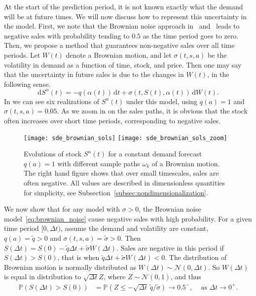 \documentclass[main.tex]{subfiles}
\begin{document}
At the start of the prediction period, it is not known exactly what
the demand will be at future times. We will now discuss how to
represent this uncertainty in the model. First, we note that the Brownian noise
approach in~\cite{raman1995optimal} and~\cite{wu2016dynamic} leads to negative
sales with probability tending to $0.5$ as the time period goes to zero.
Then, we propose a method that guarantees non-negative sales over all
time periods.
Let $W(t)$ denote a Brownian motion, and let $\sigma(t,s,a)$ be the volatility
in demand as a function of time, stock, and price. Then
one may say that the uncertainty in future
sales is due to the changes in $W(t)$, in the following sense.
\begin{equation}\label{eq:brownian_noise}
  \mathrm{d}S^\alpha(t) = -q(\alpha(t))\,\mathrm{d}t + \sigma(t,S(t),\alpha(t))\,\mathrm{d}W(t).
\end{equation}
In  we can see six realizations of
$S^\alpha(t)$ under
this model, using $q(a)=1$ and $\sigma(t,s,a)=0.05$. As we zoom in on
the sales paths, it is obvious that the stock often
increases over short time periods, corresponding to negative sales.
\begin{figure}[htbp]
  \centering
  \texttt{[image: sde\_brownian\_sols]}%
  \texttt{[image: sde\_brownian\_sols\_zoom]}
  \caption{Evolutions of stock $S^\alpha(t)$ for a constant
    demand forecast $q(a)=1$ with different sample paths $\omega_k$
    of a Brownian motion.
    The right hand figure shows that over small timescales, sales are
    often negative.
    All values are described in dimensionless quantities for
    simplicity, see Subsection~\ref{subsec:nondimensionalization}.
  }\label{fig:brownian_paths}
\end{figure}
We now show that for any model with $\sigma>0$, the Brownian noise
model~\eqref{eq:brownian_noise} cause negative sales with high
probability.
For a given time period $[0,\Delta t)$, assume the demand and volatility are constant,
$q(a)=\tilde q>0$ and $\sigma(t,s,a)=\tilde \sigma>0$.
Then $S(\Delta t)=S(0)-\tilde q\Delta t + \tilde \sigma W(\Delta t)$.
Sales are negative in this period if $S(\Delta t)>S(0)$, that is when
$\tilde q\Delta t+\tilde \sigma W(\Delta t) < 0$.
The distribution of Brownian motion is normally distributed as
$W(\Delta t)\sim \mathcal N(0,\Delta t)$. So $W(\Delta t)$ is equal in
distribution to $\sqrt{\Delta t}Z$, where $Z\sim \mathcal N(0,1)$, and thus
\begin{align}
  \mathbb P(S(\Delta t)>S(0))
  &=\mathbb P(Z\leq -\sqrt{\Delta t}\,\tilde q / \tilde \sigma)
    \to 0.5^-,& \text{ as } \Delta t \to 0^+.
\end{align}
\end{document}

